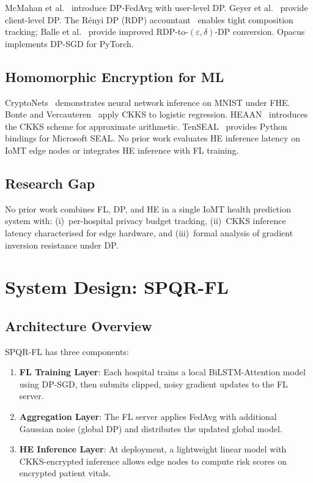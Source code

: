 \documentclass[10pt,journal,compsoc]{IEEEtran}
\begin{document}
McMahan et al.~\cite{mcmahan2018learning} introduce DP-FedAvg with
user-level DP.
Geyer et al.~\cite{geyer2017differentially} provide client-level DP.
The Rényi DP (RDP) accountant~\cite{mironov2017renyi} enables tight
composition tracking; Balle et al.~\cite{balle2020hypothesis}
provide improved RDP-to-$(ε,δ)$-DP conversion.
Opacus~\cite{yousefpour2021opacus} implements DP-SGD for PyTorch.

\subsection{Homomorphic Encryption for ML}

CryptoNets~\cite{gilad2016cryptonets} demonstrates neural network
inference on MNIST under FHE.
Bonte and Vercauteren~\cite{bonte2018privacy} apply CKKS to
logistic regression.
HEAAN~\cite{cheon2017homomorphic} introduces the CKKS scheme for
approximate arithmetic.
TenSEAL~\cite{benaissa2021tenseal} provides Python bindings for
Microsoft SEAL.
No prior work evaluates HE inference latency on IoMT edge nodes
or integrates HE inference with FL training.

\subsection{Research Gap}

No prior work combines FL, DP, and HE in a single IoMT health
prediction system with: (i)~per-hospital privacy budget tracking,
(ii)~CKKS inference latency characterised for edge hardware, and
(iii)~formal analysis of gradient inversion resistance under DP.

\section{System Design: SPQR-FL}
\label{sec:system}

\subsection{Architecture Overview}

SPQR-FL has three components:
\begin{enumerate}
\item \textbf{FL Training Layer}: Each hospital trains a local
  BiLSTM-Attention model using DP-SGD, then submits clipped,
  noisy gradient updates to the FL server.
\item \textbf{Aggregation Layer}: The FL server applies FedAvg
  with additional Gaussian noise (global DP) and distributes
  the updated global model.
\item \textbf{HE Inference Layer}: At deployment, a lightweight
  linear model with CKKS-encrypted inference allows edge nodes
  to compute risk scores on encrypted patient vitals.
\end{enumerate}
\end{document}
